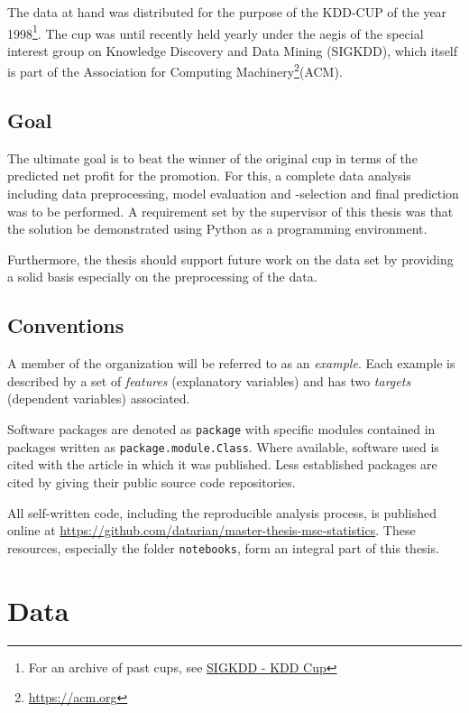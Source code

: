 \documentclass[
  11pt,
  a4paper,
  DIV=12,captions=tableheading,oneside,titlepage=firstiscover,abstracton]{scrreprt}
\begin{document}
The data at hand was distributed for the purpose of the KDD-CUP of the year 1998\footnote{For an archive of past cups, see \href{http://www.kdd.org/kdd-cup}{SIGKDD - KDD Cup}}. The cup was until recently held yearly under the aegis of the special interest group on Knowledge Discovery and Data Mining (SIGKDD), which itself is part of the Association for Computing Machinery\footnote{\url{https://acm.org}}(ACM).

\hypertarget{goal}{%
\section{Goal}\label{goal}}

The ultimate goal is to beat the winner of the original cup in terms of the predicted net profit for the promotion. For this, a complete data analysis including data preprocessing, model evaluation and -selection and final prediction was to be performed. A requirement set by the supervisor of this thesis was that the solution be demonstrated using Python as a programming environment.

Furthermore, the thesis should support future work on the data set by providing a solid basis especially on the preprocessing of the data.

\hypertarget{conventions}{%
\section{Conventions}\label{conventions}}

A member of the organization will be referred to as an \emph{example}. Each example is described by a set of \emph{features} (explanatory variables) and has two \emph{targets} (dependent variables) associated.

Software packages are denoted as \texttt{package} with specific modules contained in packages written as \texttt{package.module.Class}. Where available, software used is cited with the article in which it was published. Less established packages are cited by giving their public source code repositories.

All self-written code, including the reproducible analysis process, is published online at \url{https://github.com/datarian/master-thesis-msc-statistics}. These resources, especially the folder \texttt{notebooks}, form an integral part of this thesis.

\hypertarget{data}{%
\chapter{Data}\label{data}}
\end{document}
